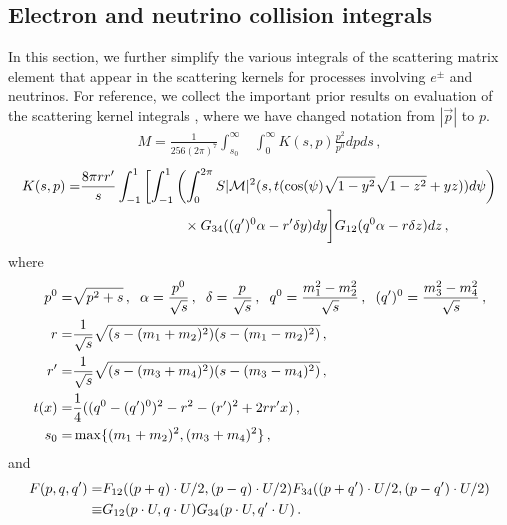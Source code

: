 \subsection{Electron and neutrino collision integrals}\label{nu:matrix:elements}
In this section, we further simplify the various integrals of the scattering matrix element that appear in the scattering kernels for processes involving $e^\pm$ and neutrinos.  For reference, we collect the important prior results 
on evaluation of the scattering kernel integrals , where we have changed notation from $|\vec p|$ to $p$.
\begin{align}\label{M:simp}
M=\frac{1}{256(2\pi)^7 }\int_{s_0}^\infty&\int_0^\infty K(s,p)\frac{ p^2}{p^0}dpds\,,
\end{align}
\begin{align}\label{matrixElemInt}
K(s,p)=&\frac{8\pi rr^{\prime}}{s}\int_{-1}^1 \left[\int_{-1}^1\left(\int_0^{2\pi} S |\mathcal{M}|^2 (s,t(\cos(\psi)\sqrt{1-y^2}\sqrt{1-z^2}+yz))d\psi\right)\right.\\
&\hspace{26mm}\times G_{34}((q^{\prime})^0\alpha-r^{\prime}\delta y) dy\bigg] G_{12}(q^0\alpha-r\delta z)dz\,,\notag
\end{align}
where
\begin{align}\label{tDef}
p^0=&\sqrt{p^2+s}\,,\hspace{2mm} \alpha=\frac{p^0}{\sqrt{s}}\,, \hspace{2mm} \delta=\frac{p}{\sqrt{s}}\,,\hspace{2mm}q^{0}=\frac{m_1^2-m_2^2}{\sqrt{s}}\,,\hspace{2mm}(q^{\prime})^{0}=\frac{m_3^2-m_4^2}{\sqrt{s}}\,,\\
r=&\frac{1}{\sqrt{s}}\sqrt{(s-(m_1+m_2)^2)(s-(m_1-m_2)^2)}\,,\notag\\
 r^{\prime}=&\frac{1}{\sqrt{s}}\sqrt{(s-(m_3+m_4)^2)(s-(m_3-m_4)^2)}\,,\notag\\
t(x)=&\frac{1}{4}((q^0-(q^{\prime})^0)^2-r^2-(r^{\prime})^2+2rr^{\prime}x)\,,\notag\\
s_0=&\max\{(m_1+m_2)^2,(m_3+m_4)^2\}\,,\notag
\end{align}
and
\begin{align}
 F(p,q,q^{\prime})=&F_{12}((p+q)\cdot U/2,(p-q)\cdot U/2)F_{34}((p+q^{\prime})\cdot U/2,(p-q^{\prime})\cdot U/2)\\
\equiv &G_{12}(p\cdot U,q\cdot U)G_{34}(p\cdot U,q^{\prime}\cdot U)\notag\,.
\end{align}

